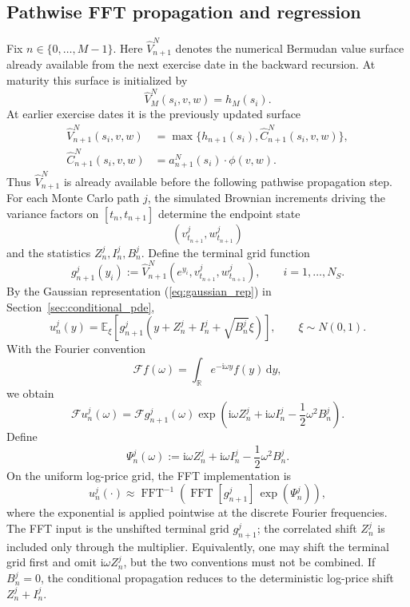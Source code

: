 \documentclass[pdflatex,sn-mathphys-num]{sn-jnl}
\theoremstyle{thmstyleone}%
\theoremstyle{thmstylethree}%
\theoremstyle{thmstyletwo}%
\newcommand{\dd}{\mathrm d}
\newcommand{\E}{\mathbb E}
\newcommand{\R}{\mathbb R}
\begin{document}
\subsection{Pathwise FFT propagation and regression}
Fix $n\in\{0,\ldots,M-1\}$. Here $\widehat V_{n+1}^N$ denotes the numerical
Bermudan value surface already available from the next exercise date in the
backward recursion. At maturity this surface is initialized by
$$
\widehat V_M^N(s_i,v,w)=h_M(s_i).
$$
At earlier exercise dates it is the previously updated surface
$$
\begin{aligned}
\widehat V_{n+1}^N(s_i,v,w)
&=
\max\{h_{n+1}(s_i),\widehat C_{n+1}^N(s_i,v,w)\},\\
\widehat C_{n+1}^N(s_i,v,w)
&=
a_{n+1}^N(s_i)\cdot\phi(v,w).
\end{aligned}
$$
Thus $\widehat V_{n+1}^N$ is already available before the following pathwise
propagation step. For each Monte Carlo path $j$, the simulated Brownian
increments driving the variance factors on $[t_n,t_{n+1}]$ determine the
endpoint state
$$
(v_{t_{n+1}}^j,w_{t_{n+1}}^j)
$$
and the statistics $Z_n^j,I_n^j,B_n^j$. Define the terminal grid function
$$
g_{n+1}^j(y_i)
:=
\widehat V_{n+1}^N
\left(e^{y_i},v_{t_{n+1}}^j,w_{t_{n+1}}^j\right),
\qquad i=1,\ldots,N_S.
$$
By the Gaussian representation (\ref{eq:gaussian_rep}) in Section~\ref{sec:conditional_pde},
$$
u_n^j(y)
=
\E_\xi\!\left[
g_{n+1}^j
\left(
y+Z_n^j+I_n^j+\sqrt{B_n^j}\xi
\right)
\right],
\qquad \xi\sim N(0,1).
$$
With the Fourier convention
$$
\mathcal F f(\omega)
=
\int_{\R}e^{-\mathrm i\omega y}f(y)\,\dd y,
$$
we obtain
$$
\mathcal F u_n^j(\omega)
=
\mathcal F g_{n+1}^j(\omega)
\exp\left(
\mathrm i\omega Z_n^j+\mathrm i\omega I_n^j-\frac12\omega^2B_n^j
\right).
$$
Define
$$
\Psi_n^j(\omega)
:=
\mathrm i\omega Z_n^j+\mathrm i\omega I_n^j-\frac12\omega^2B_n^j.
$$
On the uniform log-price grid, the FFT implementation is
\begin{equation}
u_n^j(\cdot)
\approx
\operatorname{FFT}^{-1}
\left(
\operatorname{FFT}[g_{n+1}^j]\,
\exp(\Psi_n^j)
\right),
\label{eq:fft-recursion}
\end{equation}
where the exponential is applied pointwise at the discrete Fourier frequencies.
The FFT input is the unshifted terminal grid $g_{n+1}^j$; the correlated shift
$Z_n^j$ is included only through the multiplier. Equivalently, one may shift the
terminal grid first and omit $\mathrm i\omega Z_n^j$, but the two conventions
must not be combined. If $B_n^j=0$, the conditional propagation reduces to the
deterministic log-price shift $Z_n^j+I_n^j$.
\end{document}

